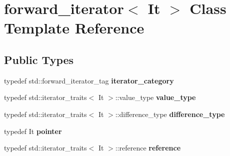\hypertarget{classforward__iterator}{}\section{forward\+\_\+iterator$<$ It $>$ Class Template Reference}
\label{classforward__iterator}
\subsection*{Public Types}
\begin{DoxyCompactItemize}
\item 
\mbox{\label{classforward__iterator_a605ebfcf02816d92b5b3087c80df0353}} 
typedef std\+::forward\+\_\+iterator\+\_\+tag {\bfseries iterator\+\_\+category}
\item 
\mbox{\label{classforward__iterator_a202702314b69abdac8a5613c8579b340}} 
typedef std\+::iterator\+\_\+traits$<$ It $>$\+::value\+\_\+type {\bfseries value\+\_\+type}
\item 
\mbox{\label{classforward__iterator_a44999d48a27d8954f8d044d6c2cafe73}} 
typedef std\+::iterator\+\_\+traits$<$ It $>$\+::difference\+\_\+type {\bfseries difference\+\_\+type}
\item 
\mbox{\label{classforward__iterator_a5a7eb422ec2ded1ac633d87aa3789474}} 
typedef It {\bfseries pointer}
\item 
\mbox{\label{classforward__iterator_ae870577b48424a4f8b464dccd1cc4cd1}} 
typedef std\+::iterator\+\_\+traits$<$ It $>$\+::reference {\bfseries reference}
\end{DoxyCompactItemize}
